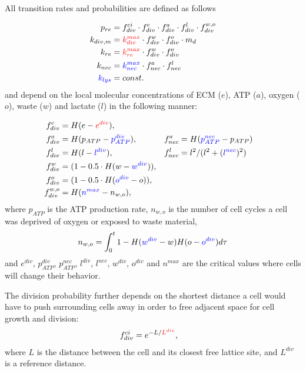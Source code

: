 \documentclass[10pt,letterpaper]{article}
\newcommand{\sI}[1]{{\color{red}#1}}
\newcommand{\sII}[1]{{\color{blue}#1}}
\begin{document}
All transition rates and probabilities are defined as follows

\begin{align}
	p_{re} &= f^{ci}_{div}\cdot f^{e}_{div} \cdot  f_{div}^{a} \cdot  f_{div}^{l}  \cdot  f_{div}^{w,o}\\
	k_{div,m}  &= \sI{k_{div}^{max}}   \cdot  f_{div}^{w}  \cdot f_{div}^{o} \cdot m_{d} \\
	k_{re}  &= \sI{k_{re}^{max}}  \cdot   f_{div}^{w}  \cdot f_{div}^{o}\\
	k_{nec} &= \sII{k_{nec}^{max}}  \cdot                                  f_{nec}^{a} \cdot  f_{nec}^{l}  \\
	\sII{k_{lys}} &= const.
\end{align}
and depend on the local molecular concentrations of ECM ($e$), ATP ($a$), oxygen ($o$), waste ($w$) and lactate ($l$) in the following manner:

\begin{align}
	f_{div}^{e} &= H(e-\sI{e^{div}}), \\
	f_{div}^{a} &= H(p_{ATP}-\sII{p^{div}_{ATP}}), & f_{nec}^{a}&=H(\sII{p^{nec}_{ATP}}-p_{ATP})\\
	f_{div}^{l}  &= H(l-\sII{l^{div}}), & f_{nec}^{l}&=l^{2} / (l^{2} + (\sII{l^{nec}})^{2})\\
	f_{div}^{w} &= (1 - 0.5 \cdot H(w-\sII{w^{div}})), \\
	f_{div}^{o} &= (1 - 0.5 \cdot H(\sII{o^{div}} - o)), \\
	f_{div}^{w,o} &= H(\sII{n^{max}} - n_{w,o}),
\end{align}
where $p_{ATP}$ is the ATP production rate, $n_{w,o}$ is the number of cell cycles a cell was deprived of oxygen or exposed to waste material, 
\begin{align}
	n_{w,o} = \int_{0}^{t}  1 -  H(\sII{w^{div}}-w)H(o - \sII{o^{div}})   d\tau
\end{align}
and $e^{div}$, $p_{ATP}^{div}$, $p_{ATP}^{nec}$, $l^{div}$, $l^{nec}$, $w^{div}$, $o^{div}$ and $n^{max}$ are the critical values where cells will change their behavior.

The division probability further depends on the shortest distance a cell would have to push surrounding cells away in order to free adjacent space for cell growth and division:
\begin{align}
	f_{div}^{ci} &= e^{-L/\sI{L^{div}}},
\end{align}
where $L$ is the distance between the cell and its closest free lattice site, and $L^{div}$ is a reference distance.
\end{document}
